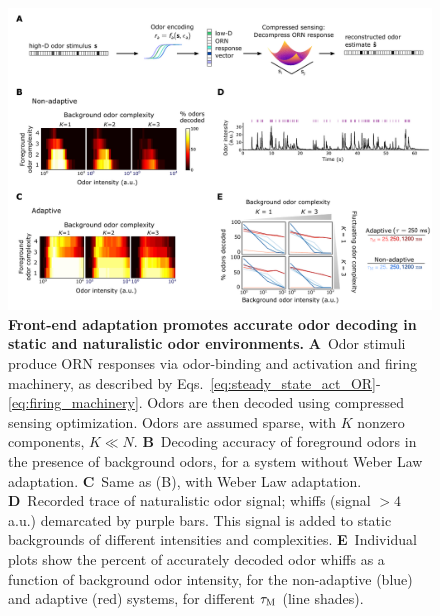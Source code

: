 \documentclass[9pt,lineno]{elife}
\begin{document}
\begin{figure}
	\begin{fullwidth}
		\includegraphics[width=0.95\linewidth]{figure3}
		\caption{\footnotesize{\textbf{Front-end adaptation promotes accurate odor decoding in static and naturalistic odor environments.}
			\textbf{A}~Odor stimuli produce ORN responses via odor-binding and activation and firing machinery, as described by Eqs.~\ref{eq:steady_state_act_OR}-\ref{eq:firing_machinery}. Odors are then decoded using compressed sensing optimization.  Odors are assumed sparse, with $K$ nonzero components, $K \ll N$. 
			\textbf{B}~Decoding accuracy of foreground odors in the presence of background odors, for a system without Weber Law adaptation. 
			\textbf{C}~Same as (B), with Weber Law adaptation.
			\textbf{D}~Recorded trace of naturalistic odor signal; whiffs (signal $> 4$ a.u.) demarcated by purple bars. This signal is added to static backgrounds of different intensities and complexities.
			\textbf{E}~Individual plots show the percent of accurately decoded odor whiffs as a function of background odor intensity, for the non-adaptive (blue) and adaptive (red) systems, for different $\tau_{\textup M}$ (line shades). 
			}}
		\label{fig:decoding}

\end{fullwidth}
\end{figure}
\end{document}
